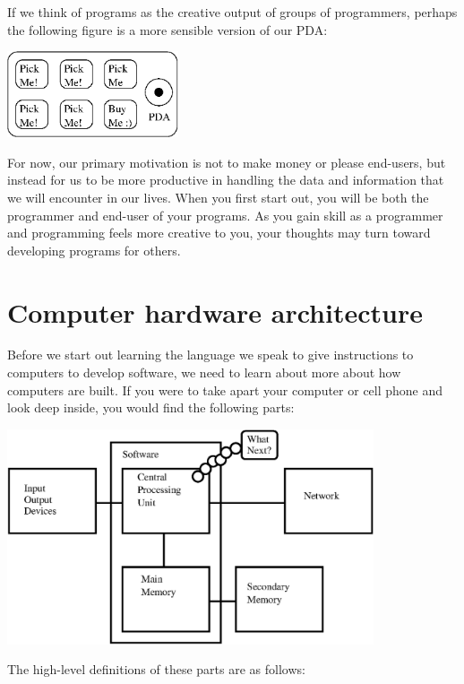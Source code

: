 \documentclass[10pt]{book}
\begin{document}
If we think of programs as the creative output of groups of programmers,
perhaps the following figure is a more sensible version of our PDA:

\beforefig
\centerline{\includegraphics[height=1.00in]{figs2/pda2.eps}}
\afterfig

For now, our primary motivation is not to make money or please end-users, but
instead for us to be more productive in handling the data and 
information that we will encounter in our lives.
When you first start out, you will be both the programmer and end-user of
your programs.  As you gain skill as a programmer and
programming feels more creative to you, your thoughts may turn
toward developing programs for others.

\section{Computer hardware architecture}

Before we start out learning the language we 
speak to give instructions to computers to 
develop software, we need to learn about more 
about how computers are built.  If you were to take
apart your computer or cell phone and look deep
inside, you would find the following parts:

\beforefig
\centerline{\includegraphics[height=2.50in]{figs2/arch.eps}}
\afterfig

The high-level definitions of these parts are as follows:
\end{document}
